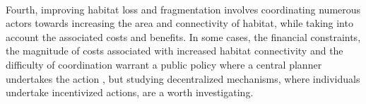\\
Fourth, improving habitat loss and fragmentation involves coordinating numerous actors towards increasing the area and connectivity of habitat, while taking into account the associated costs and benefits. In some cases, the financial constraints, the magnitude of costs associated with increased habitat connectivity and the difficulty of coordination warrant a public policy where a central planner undertakes the action \citep{Mouysset2012}, but studying decentralized mechanisms, where individuals undertake incentivized actions, are a worth investigating. 
	 
	 
